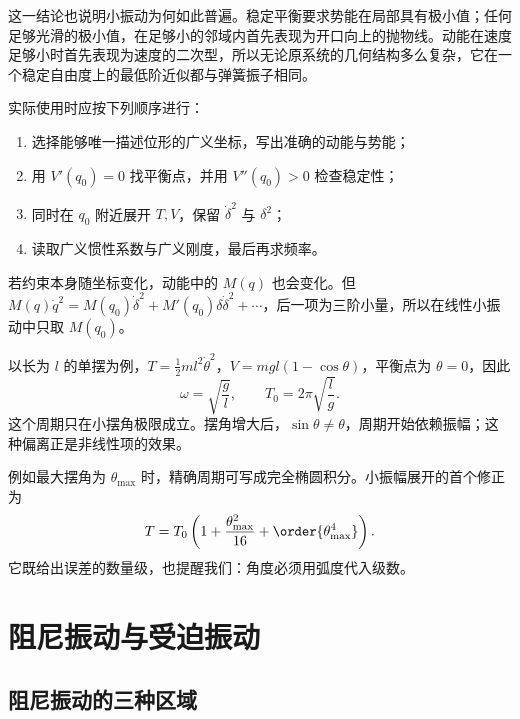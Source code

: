 这一结论也说明小振动为何如此普遍。稳定平衡要求势能在局部具有极小值；任何足够光滑的极小值，在足够小的邻域内首先表现为开口向上的抛物线。动能在速度足够小时首先表现为速度的二次型，所以无论原系统的几何结构多么复杂，它在一个稳定自由度上的最低阶近似都与弹簧振子相同。

实际使用时应按下列顺序进行：

\begin{enumerate}
 \item 选择能够唯一描述位形的广义坐标，写出准确的动能与势能；
 \item 用 $V'(q_0)=0$ 找平衡点，并用 $V''(q_0)>0$ 检查稳定性；
 \item 同时在 $q_0$ 附近展开 $T,V$，保留 $\dot\delta^2$ 与 $\delta^2$；
 \item 读取广义惯性系数与广义刚度，最后再求频率。
\end{enumerate}

若约束本身随坐标变化，动能中的 $M(q)$ 也会变化。但
$M(q)\dot q^2=M(q_0)\dot\delta^2+M'(q_0)\delta\dot\delta^2+\cdots$，后一项为三阶小量，所以在线性小振动中只取 $M(q_0)$。

以长为 $l$ 的单摆为例，$T=\tfrac12ml^2\dot\theta^2$，$V=mgl(1-\cos\theta)$，平衡点为 $\theta=0$，因此
\begin{equation}
 \omega=\sqrt{\frac gl},\qquad
 T_0=2\pi\sqrt{\frac lg}.
 \label{r2ch04:eq:009}
\end{equation}
这个周期只在小摆角极限成立。摆角增大后，$\sin\theta\ne\theta$，周期开始依赖振幅；这种偏离正是非线性项的效果。

例如最大摆角为 $\theta_{\max}$ 时，精确周期可写成完全椭圆积分。小振幅展开的首个修正为
\[
 T=T_0\left(1+\frac{\theta_{\max}^2}{16}+\order{\theta_{\max}^4}\right).
\]
它既给出误差的数量级，也提醒我们：角度必须用弧度代入级数。

\section{阻尼振动与受迫振动}
\label{r2ch04:sec:damped}

\subsection{阻尼振动的三种区域}


